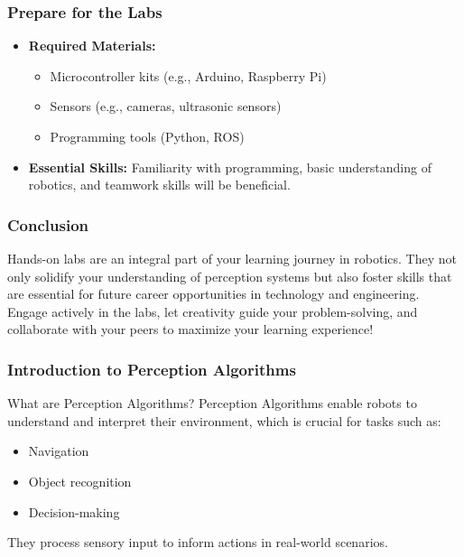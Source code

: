 \documentclass{beamer}
\begin{document}
\begin{frame}[fragile]
    \frametitle{Prepare for the Labs}
    \begin{itemize}
        \item \textbf{Required Materials:} 
            \begin{itemize}
                \item Microcontroller kits (e.g., Arduino, Raspberry Pi)
                \item Sensors (e.g., cameras, ultrasonic sensors)
                \item Programming tools (Python, ROS)
            \end{itemize}
        \item \textbf{Essential Skills:} Familiarity with programming, basic understanding of robotics, and teamwork skills will be beneficial.
    \end{itemize}
\end{frame}

\begin{frame}[fragile]
    \frametitle{Conclusion}
    Hands-on labs are an integral part of your learning journey in robotics. They not only solidify your understanding of perception systems but also foster skills that are essential for future career opportunities in technology and engineering.\\

    Engage actively in the labs, let creativity guide your problem-solving, and collaborate with your peers to maximize your learning experience!
\end{frame}

\begin{frame}[fragile]
    \frametitle{Introduction to Perception Algorithms}
    \begin{block}{What are Perception Algorithms?}
        Perception Algorithms enable robots to understand and interpret their environment, which is crucial for tasks such as:
        \begin{itemize}
            \item Navigation
            \item Object recognition
            \item Decision-making
        \end{itemize}
        They process sensory input to inform actions in real-world scenarios.
    \end{block}
\end{frame}
\end{document}
